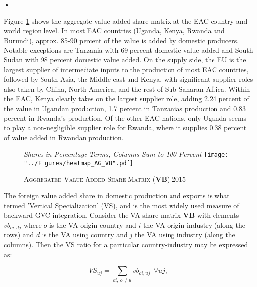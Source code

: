 \textbf{\textbf{•}}\documentclass[a4paper]{article}
\begin{document}
Figure \ref{fig:wldVB} shows the aggregate value added share matrix at the EAC country and world region level. In most EAC countries (Uganda, Kenya, Rwanda and Burundi), approx. 85-90 percent of the value is added by domestic producers. Notable exceptions are Tanzania with 69 percent domestic value added and South Sudan with 98 percent domestic value added. On the supply side, the EU is the largest supplier of intermediate inputs to the production of most EAC countries, followed by South Asia, the Middle east and Kenya, with significant supplier roles also taken by China, North America, and the rest of Sub-Saharan Africa. Within the EAC, Kenya clearly takes on the largest supplier role, adding 2.24 percent of the value in Ugandan production, 1.7 percent in Tanzanias production and 0.83 percent in Rwanda's  production. Of the other EAC nations, only Uganda seems to play a non-negligible supplier role for Rwanda, where it supplies 0.38 percent of value added in Rwandan production. 

\begin{figure}[h!]
\centering
\caption{\label{fig:wldVB}\textsc{Aggregated Value Added Share Matrix (\textbf{VB}) 2015}}
\small{\textit{Shares in Percentage Terms, Columns Sum to 100 Percent}}
\texttt{[image: "../Figures/heatmap\_AG\_VB".pdf]} %
\end{figure}
\FloatBarrier


The foreign value added share in domestic production and exports is what \citet{hummels2001nature} termed 'Vertical Specialization' (VS), and is the most widely used measure of backward GVC integration. Consider the VA share matrix \textbf{VB} with elements $vb_{oi,dj}$ where $o$ is the VA origin country and $i$ the VA origin industry (along the rows) and $d$ is the VA using country and $j$ the VA using industry (along the columns). Then the VS ratio for a particular country-industry may be expressed as:

\begin{equation} \label{eq:VS}
VS_{uj} = \sum_{oi,\ o \neq  u} vb_{oi, uj}\ \ \forall uj,
\end{equation}
\end{document}

